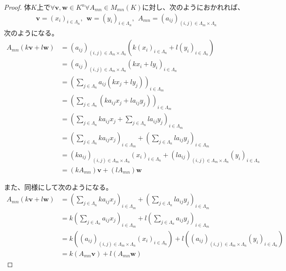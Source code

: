 \documentclass[dvipdfmx]{jsarticle}
\begin{document}
\begin{proof}
体$K$上で$\forall\mathbf{v},\mathbf{w} \in K^{n}\forall A_{mn} \in M_{mn}(K)$に対し、次のようにおかれれば、
\begin{align*}
\mathbf{v} = \left( x_{i} \right)_{i \in \varLambda_{n}},\ \ \mathbf{w} = \left( y_{i} \right)_{i \in \varLambda_{n}},\ \ A_{mn} = \left( a_{ij} \right)_{(i,j) \in \varLambda_{m} \times \varLambda_{n}}
\end{align*}
次のようになる。
\begin{align*}
A_{mn}\left( k\mathbf{v} + l\mathbf{w} \right) &= \left( a_{ij} \right)_{(i,j) \in \varLambda_{m} \times \varLambda_{n}}\left( k\left( x_{i} \right)_{i \in \varLambda_{n}} + l\left( y_{i} \right)_{i \in \varLambda_{n}} \right)\\
&= \left( a_{ij} \right)_{(i,j) \in \varLambda_{m} \times \varLambda_{n}}\left( kx_{i} + ly_{i} \right)_{i \in \varLambda_{n}}\\
&= \left( \sum_{j \in \varLambda_{n}} {a_{ij}\left( kx_{j} + ly_{j} \right)} \right)_{i \in \varLambda_{m}}\\
&= \left( \sum_{j \in \varLambda_{n}} \left( ka_{ij}x_{j} + la_{ij}y_{j} \right) \right)_{i \in \varLambda_{m}}\\
&= \left( \sum_{j \in \varLambda_{n}} {ka_{ij}x_{j}} + \sum_{j \in \varLambda_{n}} {la_{ij}y_{j}} \right)_{i \in \varLambda_{m}}\\
&= \left( \sum_{j \in \varLambda_{n}} {ka_{ij}x_{j}} \right)_{i \in \varLambda_{m}} + \left( \sum_{j \in \varLambda_{n}} {la_{ij}y_{j}} \right)_{i \in \varLambda_{m}}\\
&= \left( ka_{ij} \right)_{(i,j) \in \varLambda_{m} \times \varLambda_{n}}\left( x_{i} \right)_{i \in \varLambda_{n}} + \left( la_{ij} \right)_{(i,j) \in \varLambda_{m} \times \varLambda_{n}}\left( y_{i} \right)_{i \in \varLambda_{n}}\\
&= \left( kA_{mn} \right)\mathbf{v} + \left( lA_{mn} \right)\mathbf{w}
\end{align*}\par
また、同様にして次のようになる。
\begin{align*}
A_{mn}\left( k\mathbf{v} + l\mathbf{w} \right) &= \left( \sum_{j \in \varLambda_{n}} {ka_{ij}x_{j}} \right)_{i \in \varLambda_{m}} + \left( \sum_{j \in \varLambda_{n}} {la_{ij}y_{j}} \right)_{i \in \varLambda_{m}}\\
&= k\left( \sum_{j \in \varLambda_{n}} {a_{ij}x_{j}} \right)_{i \in \varLambda_{m}} + l\left( \sum_{j \in \varLambda_{n}} {a_{ij}y_{j}} \right)_{i \in \varLambda_{m}}\\
&= k\left( \left( a_{ij} \right)_{(i,j) \in \varLambda_{m} \times \varLambda_{n}}\left( x_{i} \right)_{i \in \varLambda_{n}} \right) + l\left( \left( a_{ij} \right)_{(i,j) \in \varLambda_{m} \times \varLambda_{n}}\left( y_{i} \right)_{i \in \varLambda_{n}} \right)\\
&= k\left( A_{mn}\mathbf{v} \right) + l\left( A_{mn}\mathbf{w} \right)
\end{align*}
\end{proof}
\end{document}
